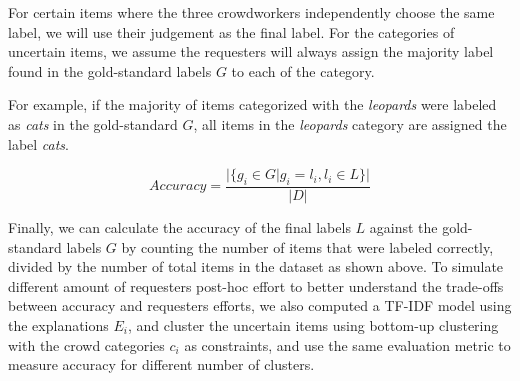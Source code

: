 For certain items where the three crowdworkers independently choose the same label, we will use their judgement as the final label. For the categories of uncertain items, we assume the requesters will always assign the majority label found in the gold-standard labels $G$ to each of the category.

For example, if the majority of items categorized with the \emph{leopards} were labeled as \emph{cats} in the gold-standard $G$, all items in the \emph{leopards} category are assigned the label \emph{cats}. 

\begin{equation}
Accuracy = \frac{\lvert \{g_i \in G | g_i = l_i, l_i \in L \} \rvert}{\lvert D \rvert}
\end{equation}

Finally, we can calculate the accuracy of the final labels $L$ against the gold-standard labels $G$ by counting the number of items that were labeled correctly, divided by the number of total items in the dataset as shown above. To simulate different amount of requesters post-hoc effort to better understand the trade-offs between accuracy and requesters efforts, we also computed a TF-IDF model using the explanations $E_i$, and cluster the uncertain items using bottom-up clustering with the crowd categories $c_i$ as constraints, and use the same evaluation metric to measure accuracy for different number of clusters. 
